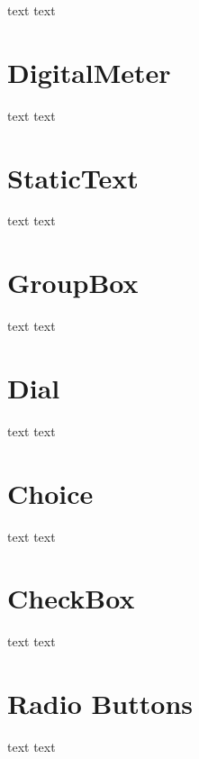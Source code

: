 text text\par
 \hypertarget{d0/d90/intro_widgets_digitalMeter}{}\section{Digital\-Meter}\label{d0/d90/intro_widgets_digitalMeter}
text text\par
 \hypertarget{d0/d90/intro_widgets_staticText}{}\section{Static\-Text}\label{d0/d90/intro_widgets_staticText}
text text\par
 \hypertarget{d0/d90/intro_widgets_groupBox}{}\section{Group\-Box}\label{d0/d90/intro_widgets_groupBox}
text text\par
 \hypertarget{d0/d90/intro_widgets_dial}{}\section{Dial}\label{d0/d90/intro_widgets_dial}
text text\par
 \hypertarget{d0/d90/intro_widgets_choice}{}\section{Choice}\label{d0/d90/intro_widgets_choice}
text text\par
 \hypertarget{d0/d90/intro_widgets_checkBox}{}\section{Check\-Box}\label{d0/d90/intro_widgets_checkBox}
text text\par
 \hypertarget{d0/d90/intro_widgets_radioButtons}{}\section{Radio Buttons}\label{d0/d90/intro_widgets_radioButtons}
text text\par
 